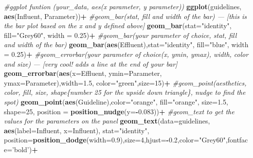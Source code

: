 \documentclass[
]{article}
\newenvironment{Shaded}{\begin{snugshade}}{\end{snugshade}}
\newcommand{\CommentTok}[1]{\textcolor[rgb]{0.56,0.35,0.01}{\textit{#1}}}
\newcommand{\DataTypeTok}[1]{\textcolor[rgb]{0.13,0.29,0.53}{#1}}
\newcommand{\DecValTok}[1]{\textcolor[rgb]{0.00,0.00,0.81}{#1}}
\newcommand{\FloatTok}[1]{\textcolor[rgb]{0.00,0.00,0.81}{#1}}
\newcommand{\KeywordTok}[1]{\textcolor[rgb]{0.13,0.29,0.53}{\textbf{#1}}}
\newcommand{\NormalTok}[1]{#1}
\newcommand{\OperatorTok}[1]{\textcolor[rgb]{0.81,0.36,0.00}{\textbf{#1}}}
\newcommand{\StringTok}[1]{\textcolor[rgb]{0.31,0.60,0.02}{#1}}
\begin{document}
\begin{Shaded}
\begin{Highlighting}[]
\CommentTok{#ggplot funtion (your_data, aes(x parameter, y parameter))}
\KeywordTok{ggplot}\NormalTok{(guidelines, }\KeywordTok{aes}\NormalTok{(Influent, Parameter))}\OperatorTok{+}
\StringTok{  }
\StringTok{  }\CommentTok{#geom_bar(stat, fill and width of the bar) --- [this is the bar plot based on the x and y defined above]}
\StringTok{  }\KeywordTok{geom_bar}\NormalTok{(}\DataTypeTok{stat=}\StringTok{"identity"}\NormalTok{, }\DataTypeTok{fill=}\StringTok{"Grey60"}\NormalTok{, }\DataTypeTok{width =} \FloatTok{0.25}\NormalTok{)}\OperatorTok{+}
\StringTok{  }
\StringTok{  }\CommentTok{#geom_bar(your parameter of choice, stat, fill and width of the bar)}
\StringTok{  }\KeywordTok{geom_bar}\NormalTok{(}\KeywordTok{aes}\NormalTok{(Effluent),}\DataTypeTok{stat=}\StringTok{"identity"}\NormalTok{, }\DataTypeTok{fill=}\StringTok{"blue"}\NormalTok{, }\DataTypeTok{width =} \FloatTok{0.25}\NormalTok{)}\OperatorTok{+}
\StringTok{  }
\StringTok{  }\CommentTok{#geom_errorbar(your parameter of choice(x, ymin, ymax), width, color and size) --- [very cool! adds a line at the end of your bar] }
\StringTok{  }\KeywordTok{geom_errorbar}\NormalTok{(}\KeywordTok{aes}\NormalTok{(}\DataTypeTok{x=}\NormalTok{Effluent, }\DataTypeTok{ymin=}\NormalTok{Parameter, }\DataTypeTok{ymax=}\NormalTok{Parameter),}\DataTypeTok{width=}\FloatTok{1.5}\NormalTok{, }\DataTypeTok{color=}\StringTok{"green"}\NormalTok{,}\DataTypeTok{size=}\DecValTok{15}\NormalTok{)}\OperatorTok{+}
\StringTok{  }
\StringTok{  }\CommentTok{#geom_point(aesthetics, color, fill, size, shape\{number 25 for the upside down triangle\}, nudge to find the spot)}
\StringTok{  }\KeywordTok{geom_point}\NormalTok{(}\KeywordTok{aes}\NormalTok{(Guideline),}\DataTypeTok{color=}\StringTok{"orange"}\NormalTok{, }\DataTypeTok{fill=}\StringTok{"orange"}\NormalTok{, }\DataTypeTok{size=}\FloatTok{1.5}\NormalTok{, }\DataTypeTok{shape=}\DecValTok{25}\NormalTok{, }\DataTypeTok{position =} \KeywordTok{position_nudge}\NormalTok{(}\DataTypeTok{y=}\OperatorTok{-}\FloatTok{0.083}\NormalTok{))}\OperatorTok{+}
\StringTok{  }
\StringTok{  }\CommentTok{#geom_text to get the values for the parameters on the panel}
\StringTok{  }\KeywordTok{geom_text}\NormalTok{(}\DataTypeTok{data=}\NormalTok{guidelines, }\KeywordTok{aes}\NormalTok{(}\DataTypeTok{label=}\NormalTok{Influent, }\DataTypeTok{x=}\NormalTok{Influent), }\DataTypeTok{stat=}\StringTok{"identity"}\NormalTok{, }\DataTypeTok{position=}\KeywordTok{position_dodge}\NormalTok{(}\DataTypeTok{width=}\FloatTok{0.9}\NormalTok{),}\DataTypeTok{size=}\DecValTok{4}\NormalTok{,}\DataTypeTok{hjust=}\OperatorTok{-}\FloatTok{0.2}\NormalTok{,}\DataTypeTok{color=}\StringTok{"Grey60"}\NormalTok{,}\DataTypeTok{fontface=}\StringTok{'bold'}\NormalTok{)}\OperatorTok{+}

\end{Highlighting}
\end{Shaded}
\end{document}
